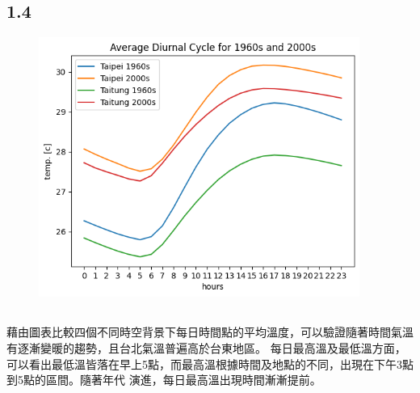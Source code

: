 \documentclass{article}
\begin{document}
\begin{CJK*}{UTF8}{bsmi}
\section*{1.4}
\begin{figure}[htbp]
    \centering
    \begin{minipage}[t]{0.7\textwidth}
        \centering
        \includegraphics[width=10.5cm]{output.png}
        \caption{}
        \end{minipage}
\end{figure}

\subsection*{}
\begin{spacing}{2}
    \begin{large}
        藉由圖表比較四個不同時空背景下每日時間點的平均溫度，可以驗證隨著時間氣溫有逐漸變暖的趨勢，且台北氣溫普遍高於台東地區。
        每日最高溫及最低溫方面，可以看出最低溫皆落在早上5點，而最高溫根據時間及地點的不同，出現在下午3點到5點的區間。隨著年代
        演進，每日最高溫出現時間漸漸提前。
    \end{large}
\end{spacing}

\end{CJK*}
\end{document}
